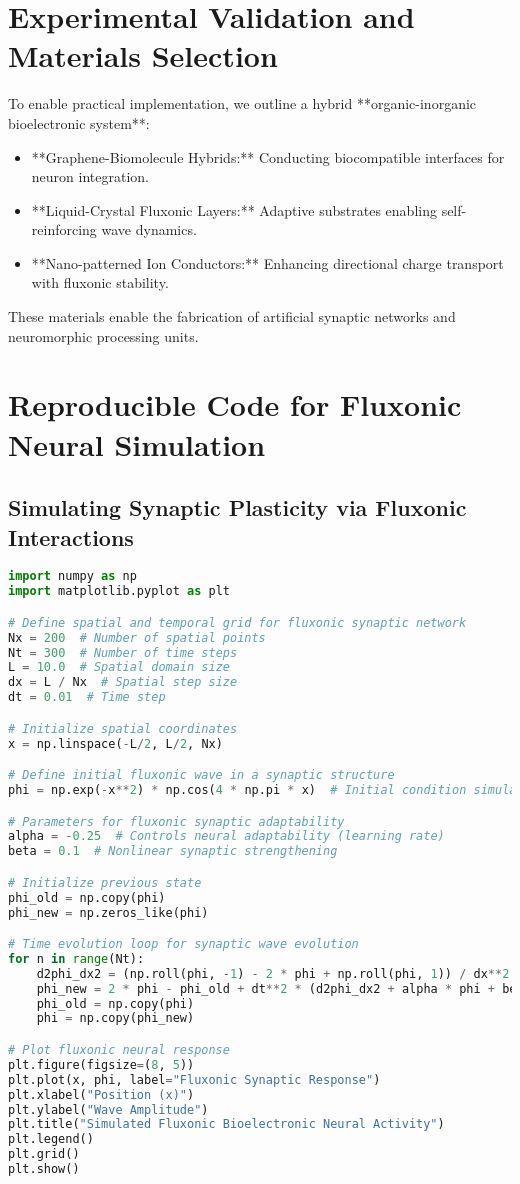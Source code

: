 \documentclass{article}
\begin{document}
\section{Experimental Validation and Materials Selection}
To enable practical implementation, we outline a hybrid **organic-inorganic bioelectronic system**:
\begin{itemize}
    \item **Graphene-Biomolecule Hybrids:** Conducting biocompatible interfaces for neuron integration.
    \item **Liquid-Crystal Fluxonic Layers:** Adaptive substrates enabling self-reinforcing wave dynamics.
    \item **Nano-patterned Ion Conductors:** Enhancing directional charge transport with fluxonic stability.
\end{itemize}
These materials enable the fabrication of artificial synaptic networks and neuromorphic processing units.

\section{Reproducible Code for Fluxonic Neural Simulation}
\subsection{Simulating Synaptic Plasticity via Fluxonic Interactions}
\begin{lstlisting}[language=Python]
import numpy as np
import matplotlib.pyplot as plt

# Define spatial and temporal grid for fluxonic synaptic network
Nx = 200  # Number of spatial points
Nt = 300  # Number of time steps
L = 10.0  # Spatial domain size
dx = L / Nx  # Spatial step size
dt = 0.01  # Time step

# Initialize spatial coordinates
x = np.linspace(-L/2, L/2, Nx)

# Define initial fluxonic wave in a synaptic structure
phi = np.exp(-x**2) * np.cos(4 * np.pi * x)  # Initial condition simulating an active synapse

# Parameters for fluxonic synaptic adaptability
alpha = -0.25  # Controls neural adaptability (learning rate)
beta = 0.1  # Nonlinear synaptic strengthening

# Initialize previous state
phi_old = np.copy(phi)
phi_new = np.zeros_like(phi)

# Time evolution loop for synaptic wave evolution
for n in range(Nt):
    d2phi_dx2 = (np.roll(phi, -1) - 2 * phi + np.roll(phi, 1)) / dx**2
    phi_new = 2 * phi - phi_old + dt**2 * (d2phi_dx2 + alpha * phi + beta * phi**3)
    phi_old = np.copy(phi)
    phi = np.copy(phi_new)

# Plot fluxonic neural response
plt.figure(figsize=(8, 5))
plt.plot(x, phi, label="Fluxonic Synaptic Response")
plt.xlabel("Position (x)")
plt.ylabel("Wave Amplitude")
plt.title("Simulated Fluxonic Bioelectronic Neural Activity")
plt.legend()
plt.grid()
plt.show()
\end{lstlisting}
\end{document}
